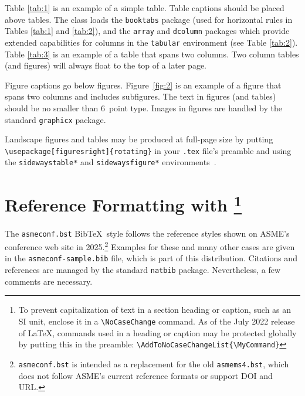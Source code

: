 \documentclass[colorlinks,upint,subscriptcorrection,varvw,balance,loadscripts,german,vietamese]{asmeconf} %
\newcommand*\BibTeX{Bib\TeX}
\begin{document}
Table \ref{tab:1} is an example of a simple table. Table captions should be placed above tables.
The class loads the \texttt{booktabs} package (used for horizontal rules in Tables \ref{tab:1} and \ref{tab:2}), and the \texttt{array} and \texttt{dcolumn} packages which provide extended capabilities for columns in the \texttt{tabular} environment (see Table \ref{tab:2}).  Table \ref{tab:3} is an example of a table that spans two columns. Two column tables (and figures) will always float to the top of a later page.

Figure captions go below figures. Figure~\ref{fig:2} is an example of a figure that spans two columns and includes subfigures. The text in figures (and tables) should be no smaller than 6~point type. Images in figures are handled by the standard \texttt{graphicx} package.

Landscape figures and tables may be produced at full-page size by putting \verb|\usepackage[figuresright]{rotating}| in your \texttt{.tex} file's preamble and using the \texttt{sidewaystable*} and \texttt{sidewaysfigure*} environments~\cite{fairbairns}.



\section{Reference Formatting with \footnote{To prevent capitalization of text in a section heading or caption, such as an SI unit, enclose it in a \texttt{\textbackslash NoCaseChange} command. As of the July 2022 release of \LaTeX, commands used in a heading or caption may be protected globally by putting this in the preamble: \texttt{\textbackslash AddToNoCaseChangeList\{\textbackslash MyCommand\}}}}\label{sec:references}

The {\upshape\texttt{asmeconf.bst}} \BibTeX\   style follows the reference styles shown on ASME's conference web site in  2025.\footnote{\texttt{asmeconf.bst} is intended as a replacement for the old \texttt{asmems4.bst}, which does not follow ASME's current reference formats or support DOI and URL.}
Examples for these and many other cases are given in the \texttt{asmeconf-sample.bib} file, which is part of this distribution. Citations and references are managed by the standard \texttt{natbib} package.  Nevertheless, a few comments are necessary. 

\end{document}
